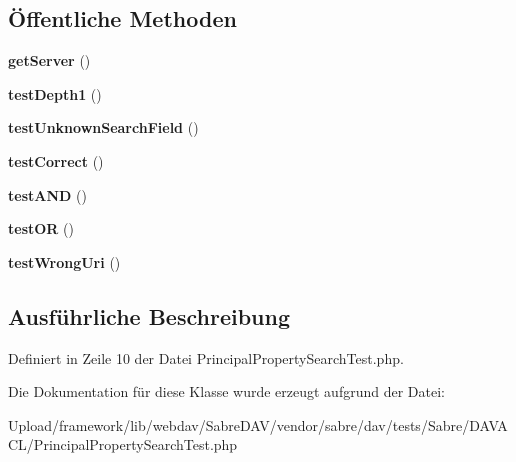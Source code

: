 \subsection*{Öffentliche Methoden}
\begin{DoxyCompactItemize}
\item 
\mbox{\label{class_sabre_1_1_d_a_v_a_c_l_1_1_principal_property_search_test_abca2ae8e904bfbd28cbbc2a376bb3938}} 
{\bfseries get\+Server} ()
\item 
\mbox{\label{class_sabre_1_1_d_a_v_a_c_l_1_1_principal_property_search_test_ae7651bad19c7cb0751641259041139ee}} 
{\bfseries test\+Depth1} ()
\item 
\mbox{\label{class_sabre_1_1_d_a_v_a_c_l_1_1_principal_property_search_test_a425e369195fbf4df9c4fdeb201576826}} 
{\bfseries test\+Unknown\+Search\+Field} ()
\item 
\mbox{\label{class_sabre_1_1_d_a_v_a_c_l_1_1_principal_property_search_test_a1f7f85aaa213f8ecf2e5d5c01341b033}} 
{\bfseries test\+Correct} ()
\item 
\mbox{\label{class_sabre_1_1_d_a_v_a_c_l_1_1_principal_property_search_test_a272d1feb51624eb80f07fb28a300f53d}} 
{\bfseries test\+A\+ND} ()
\item 
\mbox{\label{class_sabre_1_1_d_a_v_a_c_l_1_1_principal_property_search_test_a95791a06c4bafef200bad83242e7ef2d}} 
{\bfseries test\+OR} ()
\item 
\mbox{\label{class_sabre_1_1_d_a_v_a_c_l_1_1_principal_property_search_test_a720e34fbb7e87dfe848c7fab645f36df}} 
{\bfseries test\+Wrong\+Uri} ()
\end{DoxyCompactItemize}


\subsection{Ausführliche Beschreibung}


Definiert in Zeile 10 der Datei Principal\+Property\+Search\+Test.\+php.



Die Dokumentation für diese Klasse wurde erzeugt aufgrund der Datei\+:\begin{DoxyCompactItemize}
\item 
Upload/framework/lib/webdav/\+Sabre\+D\+A\+V/vendor/sabre/dav/tests/\+Sabre/\+D\+A\+V\+A\+C\+L/Principal\+Property\+Search\+Test.\+php\end{DoxyCompactItemize}
